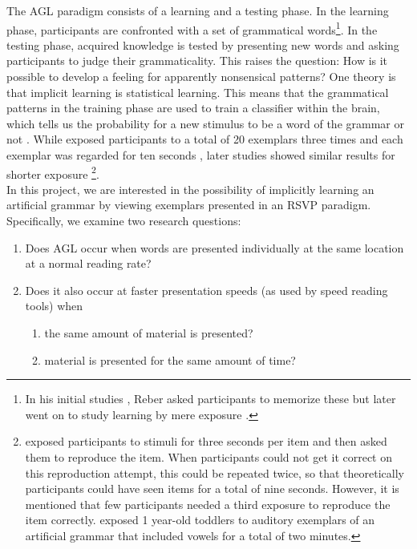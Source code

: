 The AGL paradigm consists of a learning and a testing phase. In the learning phase, participants are confronted with a set of grammatical words\footnote{In his initial studies \citep{reber1967implicit}, Reber asked participants to memorize these but later went on to study learning by mere exposure \citep{reber1978analogic}.}. In the testing phase, acquired knowledge is tested by presenting new words and asking participants to judge their grammaticality. 
This raises the question: How is it possible to develop a feeling for apparently nonsensical patterns? One theory is that implicit learning is statistical learning. This means that the grammatical patterns in the training phase are used to train a classifier within the brain, which tells us the probability for a new stimulus to be a word of the grammar or not \citep{perruchet2006implicit,saffran2002constraints}.
While \citeauthor{reber1967implicit} exposed participants to a total of 20 exemplars three times and each exemplar was regarded for ten seconds \citep{reber1978analogic}, later studies showed similar results for shorter exposure \citep{knowlton1996artificial,gomez1999artificial}\footnote{\citeauthor{knowlton1996artificial} exposed participants to stimuli for three seconds per item and then asked them to reproduce the item. When participants could not get it correct on this reproduction attempt, this could be repeated twice, so that theoretically participants could have seen items for a total of nine seconds. However, it is mentioned that few participants needed a third exposure to reproduce the item correctly. \citeauthor{gomez1999artificial} exposed 1 year-old toddlers to auditory exemplars of an artificial grammar that included vowels for a total of two minutes.}.\\
In this project, we are interested in the possibility of implicitly learning an artificial grammar by viewing exemplars presented in an RSVP paradigm. Specifically, we examine two research questions:
\begin{enumerate}
\item \label{item1}Does AGL occur when words are presented individually at the same location at a normal reading rate?
\item \label{item2}Does it also occur at faster presentation speeds (as used by speed reading tools) when
\begin{enumerate}
\item \label{item2a}the same amount of material is presented?
\item \label{item2b}material is presented for the same amount of time? 
\end{enumerate}
\end{enumerate}
